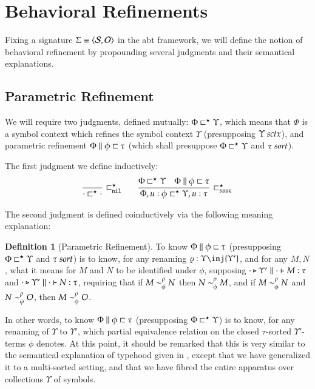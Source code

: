 \documentclass[11pt]{article}
\theoremstyle{definition}
\newtheorem{definition}[thm]{Definition}
\theoremstyle{remark}
\numberwithin{equation}{section}
\def\IModeColorName{MidnightBlue}
\def\OModeColorName{Maroon}
\def\IModeColorName{Black}
\def\OModeColorName{Black}
\newcommand\IMode[1]{{\color{\IModeColorName}{#1}}}
\newcommand\OMode[1]{{\color{\OModeColorName}{#1}}}
\newcommand\Of[2]{\IMode{#1}: \IMode{#2}}
\newcommand\IsSort[1]{\IMode{#1}\ \textit{sort}}
\newcommand\Match[2]{\IMode{#1}\equiv\OMode{#2}}
\newcommand\Sorts{\mathcal{S}}
\newcommand\Operators{\mathcal{O}}
\newcommand\IsSymCtx[1]{\IMode{#1}\ \textit{sctx}}
\newcommand\Pair[2]{\left\langle#1, #2 \right\rangle}
\newcommand\IsAbtUnmoded[5]{
  #1\triangleright%
  #2\parallel%
  #3\vdash%
  #4:\OMode{#5}%
}
\newcommand\IsAbt[5]{\IsAbtUnmoded{\IMode{#1}}{\IMode{#2}}{\IMode{#3}}{\IMode{#4}}{\OMode{#5}}}
\newcommand\Refines[3]{\IMode{#1}\parallel\IMode{#2}\sqsubset\OMode{#3}}
\newcommand\RefinesCtx[2]{\IMode{#1}\sqsubset^\star\OMode{#2}}
\begin{document}
\section{Behavioral Refinements}

Fixing a signature $\Match{\Sigma}{\Pair{\Sorts}{\Operators}}$ in the abt
framework, we will define the notion of behavioral refinement by propounding
several judgments and their semantical explanations.

\subsection{Parametric Refinement}

We will require two judgments, defined mutually: $\RefinesCtx{\Phi}{\Upsilon}$,
which means that $\Phi$ is a symbol context which refines the symbol context
$\Upsilon$ (presupposing $\IsSymCtx{\Upsilon}$), and parametric refinement
$\Refines{\Phi}{\phi}{\tau}$ (which shall presuppose
$\RefinesCtx{\Phi}{\Upsilon}$ and $\IsSort{\tau}$).

\newcommand\RefinesCtxNil{\sqsubset^\star_{\mathtt{nil}}}
\newcommand\RefinesCtxSnoc{\sqsubset^\star_{\mathtt{snoc}}}

The first judgment we define inductively:
\begin{gather*}
  \infer[\RefinesCtxNil]{
    \RefinesCtx{\cdot}{\cdot}
  }{
  }\qquad
  \infer[\RefinesCtxSnoc]{
    \RefinesCtx{\Phi,u:\phi}{\Upsilon,u:\tau}
  }{
    \RefinesCtx{\Phi}{\Upsilon} &
    \Refines{\Phi}{\phi}{\tau}
  }
\end{gather*}

The second judgment is defined coinductively via the following meaning
explanation:
\begin{definition}[Parametric Refinement]
  To know $\Refines{\Phi}{\phi}{\tau}$ (presupposing
  $\RefinesCtx{\Phi}{\Upsilon}$ and $\IsSort{\tau}$) is to know, for any renaming
  $\Of{\varrho}{\Upsilon\inj\OMode{\Upsilon'}}$, and for any $M, N$,
  what it means for $M$ and $N$ to be identified under $\phi$, supposing
  $\IsAbt{\cdot}{\Upsilon'}{\cdot}{M}{\tau}$ and
  $\IsAbt{\cdot}{\Upsilon'}{\cdot}{N}{\tau}$, requiring that if
  $\IMode{M}\sim^\rho_\phi\IMode{N}$ then $\IMode{N}\sim^\rho_\phi\IMode{M}$, and if
  $\IMode{M}\sim^\rho_\phi\IMode{N}$ and $\IMode{N}\sim^\rho_\phi\IMode{O}$, then
  $\IMode{M}\sim^\rho_\phi\IMode{O}$.
\end{definition}

In other words, to know $\Refines{\Phi}{\phi}{\tau}$ (presupposing
$\RefinesCtx{\Phi}{\Upsilon}$) is to know, for any renaming of $\Upsilon$ to
$\Upsilon'$, which partial equivalence relation on the closed $\tau$-sorted
$\Upsilon'$-terms $\phi$ denotes. At this point, it should be remarked that
this is very similar to the semantical explanation of typehood given in
\cite{martin-lof:1979}, except that we have generalized it to a multi-sorted
setting, and that we have fibred the entire apparatus over collections
$\Upsilon$ of symbols.
\end{document}
